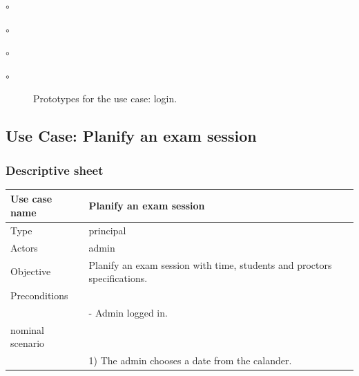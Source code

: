 \documentclass[]{uc2pfecaneva}
\begin{document}
\begin{list}{$\circ$}{}
\begin{list}{$\circ$}{}
\begin{list}{$\circ$}{}
\begin{list}{$\circ$}{}
\begin{figure}[h]
        \caption{Prototypes for the use case: login.}
    \end{figure}
    \clearpage


    \begin{table}[t]
        \raggedright\subsection{Use Case: Planify an exam session}
        \subsubsection{Descriptive sheet}
        \centering
        \begin{tabularx}{\textwidth}{|l|X|}
            \hline
            Use case name         & Planify an exam session                                                                                                                                            \\ \hline
            Type                  & principal                                                                                                                                                         \\ \hline
            Actors                & admin                                                                                                                                                             \\ \hline
            Objective             & Planify an exam session with time, students and proctors specifications.                                                                                           \\ \hline
            Preconditions         &                                                                                                                                                                   \\
            & - Admin logged in.                                                                                                                                                \\\hline
            nominal scenario      &                                                                                                                                                                   \\
            & 1) The admin chooses a date from the calander.                                                                                                           \\

\end{tabularx}
\end{table}
\end{list}
\end{list}
\end{list}
\end{list}
\end{document}
